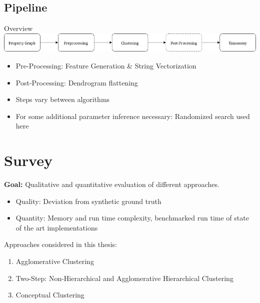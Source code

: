 \documentclass[rgb]{beamer}
\begin{document}
    \subsection{Pipeline}
    \begin{frame}{Overview}
        \includegraphics[keepaspectratio,width=\textwidth, height=0.7\textheight]{img/pipeline.png}
        \vspace{2cm}
        \begin{itemize}
            \item Pre-Processing: Feature Generation \& String Vectorization
            \item Post-Processing: Dendrogram flattening
            \item Steps vary between algorithms
            \item For some additional parameter inference necessary: Randomized search used here
        \end{itemize}
    \end{frame}
    
\section{Survey}
    \begin{frame}
        \sectionpage
        \textbf{Goal:} Qualitative and quantitative evaluation of different approaches. \\ \vspace{0.7cm}
        \begin{itemize}
            \item Quality: Deviation from synthetic ground truth
            \item Quantity: Memory and run time complexity, benchmarked run time of state of the art implementations
        \end{itemize}
        \vspace{0.7cm}
        Approaches considered in this thesis: \\ \vspace{0.3cm}
        \begin{enumerate}
            \item Agglomerative Clustering~\cite{Ward1963HierarchicalGT}
            \item Two-Step: Non-Hierarchical and Agglomerative Hierarchical Clustering~\cite{mcinnes2017hdbscan}
            \item Conceptual Clustering~\cite{michalski1980knowledge}
        \end{enumerate}
    \end{frame}
    
\end{document}
